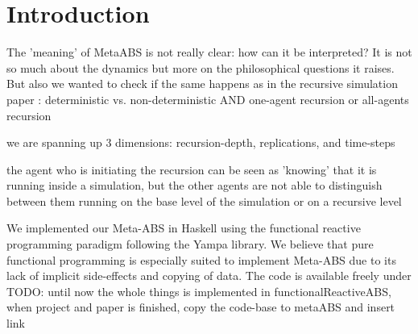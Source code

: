 \section{Introduction}
The 'meaning' of MetaABS is not really clear: how can it be interpreted?
It is not so much about the dynamics but more on the philosophical questions it raises.
But also we wanted to check if the same happens as in the recursive simulation paper \cite{gilmer_recursive_2000} : deterministic vs. non-deterministic AND one-agent recursion or all-agents recursion

we are spanning up 3 dimensions: recursion-depth, replications, and time-steps

the agent who is initiating the recursion can be seen as 'knowing' that it is running inside a simulation, but the other agents are not able to distinguish between them running on the base level of the simulation or on a recursive level

We implemented our Meta-ABS in Haskell using the functional reactive programming paradigm following the Yampa library. We believe that pure functional programming is especially suited to implement Meta-ABS due to its lack of implicit side-effects and copying of data. The code is available freely under
TODO: until now the whole things is implemented in functionalReactiveABS,  when project and paper is finished, copy the code-base to metaABS and insert link